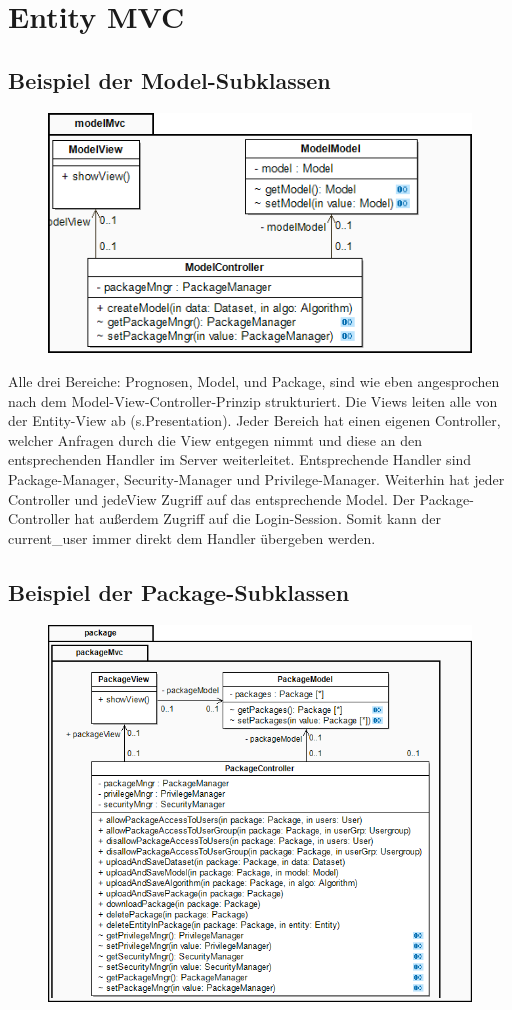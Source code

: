 \section{Entity MVC}

\subsection{Beispiel der Model-Subklassen}

\begin{figure}[h]
\centering
\includegraphics[width=0.6\linewidth]{Grafik/Klassendiagramme/Entity_mvc_sub.png}
\end{figure}

Alle drei Bereiche: Prognosen, Model, und Package, sind wie eben angesprochen nach dem Model-View-Controller-Prinzip strukturiert. Die Views leiten alle von der Entity-View ab (s.Presentation).
Jeder Bereich hat einen eigenen Controller, welcher Anfragen durch die View entgegen nimmt und diese an den entsprechenden Handler im Server weiterleitet.
Entsprechende Handler sind Package-Manager, Security-Manager und Privilege-Manager. Weiterhin hat jeder Controller und jedeView Zugriff auf das entsprechende 
Model. Der Package-Controller hat außerdem Zugriff auf die Login-Session. Somit kann der current\_user immer direkt dem Handler übergeben werden.

\subsection{Beispiel der Package-Subklassen}

\begin{figure}[h]
\centering
\includegraphics[width=0.6\linewidth]{Grafik/Klassendiagramme/Entity_mvc_sub2.png}
\end{figure}